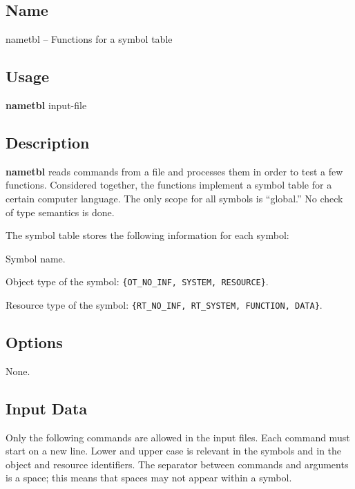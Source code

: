 %
%

\subsection*{Name}
nametbl -- Functions for a symbol table

\subsection*{Usage}
{\bf nametbl} input-file

\subsection*{Description}
{\bf nametbl}
reads commands from a file and processes them in order to
test a few functions. 
Considered together, the functions implement a symbol table for a
certain computer language.
The only scope for all symbols is ``global.''
No check of type semantics is done.

The symbol table stores the following information for each symbol:

\noindent
Symbol name.

\noindent
Object type of the symbol: {\tt \{OT\_NO\_INF, SYSTEM, RESOURCE\}}.

\noindent
Resource type of the symbol: {\tt \{RT\_NO\_INF, RT\_SYSTEM, FUNCTION, DATA\}}.

\subsection*{Options}
None.

\subsection*{Input Data}

Only the following commands are allowed in the input files.
Each command must start on a new line.
Lower and upper case is relevant in the symbols and in the object and
resource identifiers.
The separator between commands and arguments is a space; this means that
spaces may not appear within a symbol.

